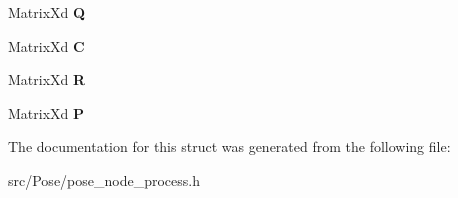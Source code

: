\begin{DoxyCompactItemize}
Matrix\+Xd {\bfseries Q}
\item 
\mbox{\label{structKalmanFilter_a2aa600278de1aa173c8bb60f57ee111d}} 
Matrix\+Xd {\bfseries C}
\item 
\mbox{\label{structKalmanFilter_a7fa292570199f25ba7b2a15216bc503e}} 
Matrix\+Xd {\bfseries R}
\item 
\mbox{\label{structKalmanFilter_a874fa540953a621f5073c9251702e8ae}} 
Matrix\+Xd {\bfseries P}
\end{DoxyCompactItemize}


The documentation for this struct was generated from the following file\+:\begin{DoxyCompactItemize}
\item 
src/\+Pose/pose\+\_\+node\+\_\+process.\+h\end{DoxyCompactItemize}
